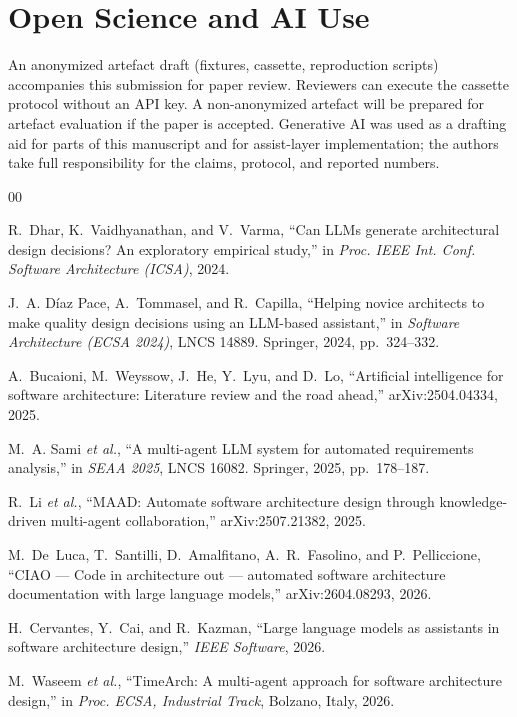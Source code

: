 \documentclass[conference]{IEEEtran}
\begin{document}
\section*{Open Science and AI Use}

An anonymized artefact draft (fixtures, cassette, reproduction scripts) accompanies this submission for paper review.
Reviewers can execute the cassette protocol without an API key.
A non-anonymized artefact will be prepared for artefact evaluation if the paper is accepted.
Generative AI was used as a drafting aid for parts of this manuscript and for assist-layer implementation; the authors take full responsibility for the claims, protocol, and reported numbers.

\begin{thebibliography}{00}

R.~Dhar, K.~Vaidhyanathan, and V.~Varma, ``Can LLMs generate architectural design decisions? An exploratory empirical study,'' in \textit{Proc. IEEE Int. Conf. Software Architecture (ICSA)}, 2024.

J.~A. D{\'i}az Pace, A.~Tommasel, and R.~Capilla, ``Helping novice architects to make quality design decisions using an LLM-based assistant,'' in \textit{Software Architecture (ECSA 2024)}, LNCS 14889. Springer, 2024, pp.~324--332.

A.~Bucaioni, M.~Weyssow, J.~He, Y.~Lyu, and D.~Lo, ``Artificial intelligence for software architecture: Literature review and the road ahead,'' arXiv:2504.04334, 2025.

M.~A. Sami \textit{et al.}, ``A multi-agent LLM system for automated requirements analysis,'' in \textit{SEAA 2025}, LNCS 16082. Springer, 2025, pp.~178--187.

R.~Li \textit{et al.}, ``MAAD: Automate software architecture design through knowledge-driven multi-agent collaboration,'' arXiv:2507.21382, 2025.

M.~De~Luca, T.~Santilli, D.~Amalfitano, A.~R.~Fasolino, and P.~Pelliccione, ``CIAO --- Code in architecture out --- automated software architecture documentation with large language models,'' arXiv:2604.08293, 2026.

H.~Cervantes, Y.~Cai, and R.~Kazman, ``Large language models as assistants in software architecture design,'' \textit{IEEE Software}, 2026.

M.~Waseem \textit{et al.}, ``TimeArch: A multi-agent approach for software architecture design,'' in \textit{Proc. ECSA, Industrial Track}, Bolzano, Italy, 2026.


\end{thebibliography}
\end{document}

